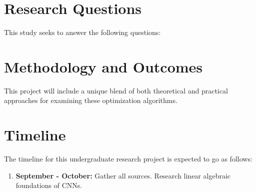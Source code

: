 \documentclass[12pt]{article}
\begin{document}
\section*{Research Questions}
This study seeks to answer the following questions: 

\section*{Methodology and Outcomes}
This project will include a unique blend of 
both theoretical and practical approaches for examining 
these optimization algorithms. 


\section*{Timeline}
The timeline for this undergraduate research project 
is expected to go as follows:
\begin{enumerate}
    \item \textbf{September - October:} Gather all sources. Research linear algebraic
    foundations of CNNs. 
\end{enumerate}

 

\end{document}
